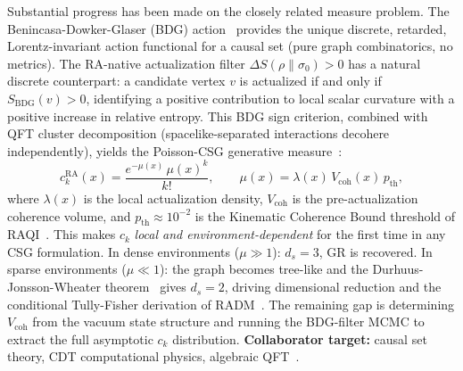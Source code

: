 \documentclass[11pt,a4paper]{article}
\theoremstyle{plain}
\theoremstyle{definition}
\theoremstyle{remark}
\begin{document}
\begin{description}
  Substantial progress has been made on the closely related measure problem.
  The Benincasa-Dowker-Glaser (BDG) action~\citep{Benincasa2010} provides the
  unique discrete, retarded, Lorentz-invariant action functional for a causal
  set (pure graph combinatorics, no metrics). The RA-native actualization filter
  $\Delta S(\rho\|\sigma_0) > 0$ has a natural discrete counterpart: a candidate
  vertex $v$ is actualized if and only if $S_{\mathrm{BDG}}(v) > 0$, identifying
  a positive contribution to local scalar curvature with a positive increase in
  relative entropy. This BDG sign criterion, combined with QFT cluster
  decomposition (spacelike-separated interactions decohere independently), yields
  the Poisson-CSG generative measure~\citep{Sandeman2026b}:
  \begin{equation}
    c_k^{\mathrm{RA}}(x) = \frac{e^{-\mu(x)}\,\mu(x)^k}{k!},
    \qquad
    \mu(x) = \lambda(x)\,V_{\mathrm{coh}}(x)\,p_{\mathrm{th}},
  \end{equation}
  where $\lambda(x)$ is the local actualization density, $V_{\mathrm{coh}}$ is
  the pre-actualization coherence volume, and $p_{\mathrm{th}} \approx 10^{-2}$
  is the Kinematic Coherence Bound threshold of RAQI~\citep{Sandeman2026d}.
  This makes $c_k$ \emph{local and environment-dependent} for the first time in
  any CSG formulation. In dense environments ($\mu \gg 1$): $d_s = 3$, GR is
  recovered. In sparse environments ($\mu \ll 1$): the graph becomes tree-like
  and the Durhuus-Jonsson-Wheater theorem~\citep{Durhuus2010} gives $d_s = 2$,
  driving dimensional reduction and the conditional Tully-Fisher derivation of
  RADM~\citep{Sandeman2026RADM}. The remaining gap is determining $V_{\mathrm{coh}}$
  from the vacuum state structure and running the BDG-filter MCMC to extract
  the full asymptotic $c_k$ distribution.
  \textbf{Collaborator target:} causal set theory, CDT computational physics,
  algebraic QFT~\citep{Dowker2005,RideoutSorkin2000}.


\end{description}
\end{document}
